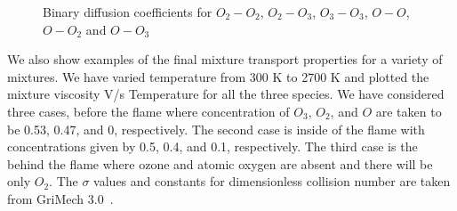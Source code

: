 \begin{figure}[H]


    \caption{Binary diffusion coefficients for $O_2-O_2$, $O_2-O_3$, $O_3-O_3$, $O-O$, $O-O_2$ and $O-O_3$}
\end{figure}


We also show examples of the final mixture transport properties for a
variety of mixtures. We have varied temperature from 300 K to 2700 K and plotted the
mixture viscosity V/s Temperature for all the three species.  We have
considered three cases, before the flame where concentration of
$O_3$, $O_2$, and $O$ are taken to be 0.53, 0.47, and 0,
respectively. The second case is inside of the flame with
concentrations given by 0.5, 0.4, and 0.1, respectively. The third
case is the behind the flame where ozone and atomic oxygen are absent and
there will be only $O_2$. The $\sigma$ values and constants for
dimensionless collision number are taken from GriMech 3.0~\cite{gri}.

